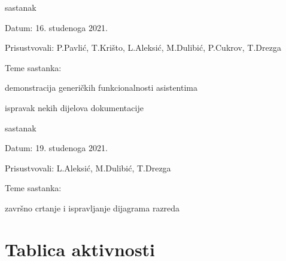 \begin{packed_enum}
			\item  sastanak
			\item[] \begin{packed_item}
				\item Datum: 16. studenoga 2021.
				\item Prisustvovali: P.Pavlić, T.Krišto, L.Aleksić, M.Dulibić, P.Cukrov, T.Drezga
				\item Teme sastanka:
				\begin{packed_item}
					\item demonstracija generičkih funkcionalnosti asistentima
					\item ispravak nekih dijelova dokumentacije
				\end{packed_item}
			\end{packed_item}
			
			\item  sastanak
			\item[] \begin{packed_item}
				\item Datum: 19. studenoga 2021.
				\item Prisustvovali: L.Aleksić, M.Dulibić, T.Drezga
				\item Teme sastanka:
				\begin{packed_item}
					\item završno crtanje i ispravljanje dijagrama razreda
				\end{packed_item}
			\end{packed_item}
						
		\end{packed_enum}
		
		\eject
		\section*{Tablica aktivnosti}
		
%			

